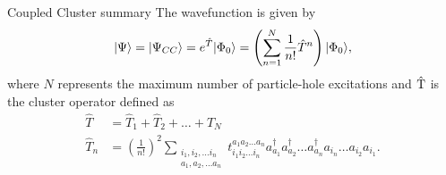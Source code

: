 \begin{frame}{Coupled Cluster summary}
    The wavefunction is given by
        \begin{equation*}
            |\Psi\rangle = |\Psi_{CC}\rangle = e^{\hat{T}} |\Phi_0\rangle =  
                \left( \sum_{n=1}^{N} \frac{1}{n!} \hat{T}^n \right) |\Phi_0\rangle,
        \end{equation*}
        where $N$ represents the maximum number of particle-hole excitations and $\hat{\mathrm{T}}$ is the cluster operator defined as
        \begin{align*}
            \hat{T} &= \hat{T}_1 + \hat{T}_2 + \ldots + \hat{T}_N \\
            \hat{T}_n &= \left(\frac{1}{n!}\right)^2 
                \sum_{\substack{
                        i_1,i_2,\ldots i_n \\
                        a_1,a_2,\ldots a_n}}
                t_{i_1i_2\ldots i_n}^{a_1a_2\ldots a_n} a_{a_1}^\dagger a_{a_2}^\dagger \ldots a_{a_n}^\dagger a_{i_n} \ldots a_{i_2} a_{i_1}.
        \end{align*}
\end{frame}

    
